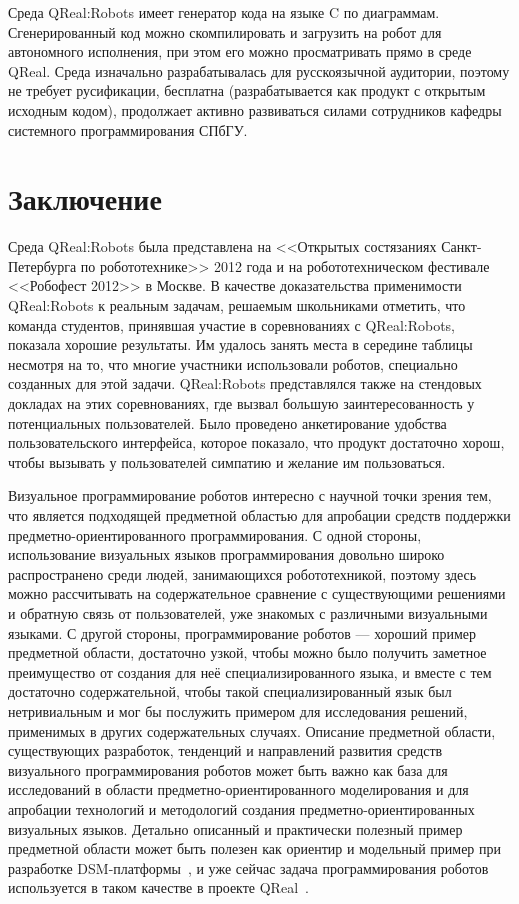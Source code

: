 \documentclass[a4paper]{article}
\begin{document}
Среда QReal:Robots имеет генератор кода на языке C по диаграммам. Сгенерированный код можно скомпилировать и загрузить на робот для автономного исполнения, при этом его можно просматривать прямо в среде QReal. Среда изначально разрабатывалась для русскоязычной аудитории, поэтому не требует русификации, бесплатна (разрабатывается как продукт с открытым исходным кодом), продолжает активно развиваться силами сотрудников кафедры системного программирования СПбГУ.

\section*{Заключение}

Среда QReal:Robots была представлена на <<Открытых состязаниях Санкт-Петербурга по робототехнике>> 2012 года и на робототехническом фестивале <<Робофест 2012>> в Москве. В качестве доказательства применимости QReal:Robots к реальным задачам, решаемым школьниками отметить, что команда студентов, принявшая  участие в соревнованиях с QReal:Robots, показала хорошие результаты. Им удалось занять места в середине таблицы несмотря на то, что многие участники использовали роботов, специально созданных для этой задачи. QReal:Robots представлялся также на стендовых докладах на этих соревнованиях, где вызвал большую заинтересованность у потенциальных пользователей. Было проведено анкетирование удобства пользовательского интерфейса, которое показало, что продукт достаточно хорош, чтобы вызывать у пользователей симпатию и желание им пользоваться.

Визуальное программирование роботов интересно с научной точки зрения тем, что является подходящей предметной областью для апробации средств поддержки предметно-ориентированного программирования. С одной стороны, использование визуальных языков программирования довольно широко распространено среди людей, занимающихся робототехникой, поэтому здесь можно рассчитывать на содержательное сравнение с существующими решениями и обратную связь от пользователей, уже знакомых с различными визуальными языками. С другой стороны, программирование роботов --- хороший пример предметной области, достаточно узкой, чтобы можно было получить заметное преимущество от создания для неё специализированного языка, и вместе с тем достаточно содержательной, чтобы такой специализированный язык был нетривиальным и мог бы послужить примером для исследования решений, применимых в других содержательных случаях. Описание предметной области, существующих разработок, тенденций и направлений развития средств визуального программирования роботов может быть важно как база для исследований в области предметно-ориентированного моделирования и для апробации технологий и методологий создания предметно-ориентированных визуальных языков. Детально описанный и практически полезный пример предметной области может быть полезен как ориентир и модельный пример при разработке DSM-платформы~\cite{dsmPlatforms}, и уже сейчас задача программирования роботов используется в таком качестве в проекте QReal~\cite{qReal}.
\end{document}
